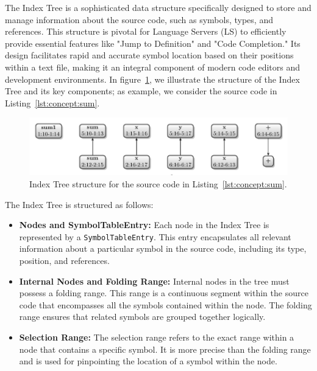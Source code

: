 The Index Tree is a sophisticated data structure specifically designed to store and manage information about the source code, such as symbols, types, and references. This structure is pivotal for Language Servers (LS) to efficiently provide essential features like "Jump to Definition" and "Code Completion." Its design facilitates rapid and accurate symbol location based on their positions within a text file, making it an integral component of modern code editors and development environments. In figure~\ref{lst:conept:lsp_combinations}, we illustrate the structure of the Index Tree and its key components; as example, we consider the source code in Listing~\ref{lst:concept:sum}.

\begin{figure}[t]
    \centering
    \includegraphics[width=0.9\linewidth]{figs/concept/index_tree.pdf}
    \caption{Index Tree structure for the source code in Listing~\ref{lst:concept:sum}.}
    \label{lst:conept:lsp_combinations}
\end{figure}


The Index Tree is structured as follows:
\begin{itemize}
    \item \textbf{Nodes and SymbolTableEntry:} Each node in the Index Tree is represented by a \texttt{SymbolTableEntry}. This entry encapsulates all relevant information about a particular symbol in the source code, including its type, position, and references.
    \item \textbf{Internal Nodes and Folding Range:} Internal nodes in the tree must possess a folding range. This range is a continuous segment within the source code that encompasses all the symbols contained within the node. The folding range ensures that related symbols are grouped together logically.
    \item \textbf{Selection Range:} The selection range refers to the exact range within a node that contains a specific symbol. It is more precise than the folding range and is used for pinpointing the location of a symbol within the node.
\end{itemize}

